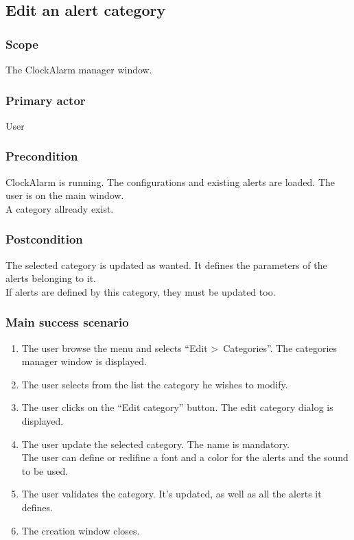 \subsection{Edit an alert category}

\subsubsection{Scope}
The ClockAlarm manager window.
\subsubsection{Primary actor}
User
\subsubsection{Precondition}
ClockAlarm is running. The configurations and existing alerts are loaded. The user is on the main window.
\\A category allready exist.
\subsubsection{Postcondition}
The selected category is updated as wanted. It defines the parameters of the alerts belonging to it.
\\ If alerts are defined by this category, they must be updated too.
\subsubsection{Main success scenario}
\begin{enumerate}
	\item The user browse the menu and selects ``Edit \textgreater~Categories''. The categories manager window is displayed. 
	\item The user selects from the list the category he wishes to modify.
	\item The user clicks on the ``Edit category'' button. The edit category dialog is displayed.
	\item\label{itm:eaac_enter_sc}The user update the selected category. The name is mandatory. \\The user can define or redifine a font and a color for the alerts and the sound to be used.
	\item\label{itm:eaac_validate_sc} The user validates the category. It's updated, as well as all the alerts it defines.
	\item The creation window closes.
\end{enumerate}
